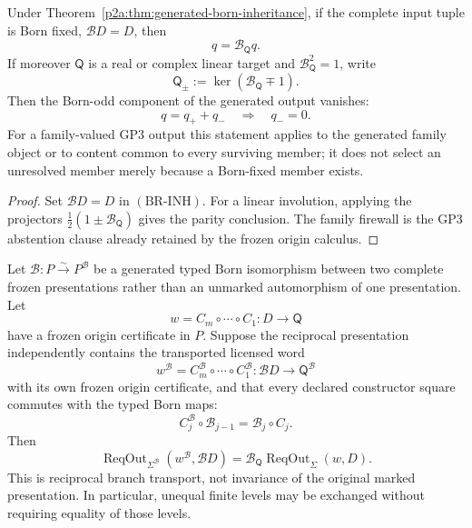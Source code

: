 \documentclass[12pt,a4paper]{article}
\begin{document}
\begin{corollary}
\label{p2a:cor:born-fixed-descendant-parity}
Under Theorem~\ref{p2a:thm:generated-born-inheritance}, if the complete input
tuple is Born fixed, \(\mathcal B D=D\), then
\[
 \boxed{q=\mathcal B_{\mathsf Q}q.}
 \tag{BR-FIX}
\]
If moreover \(\mathsf Q\) is a real or complex linear target and
\(\mathcal B_{\mathsf Q}^2=1\), write
\[
 \mathsf Q_\pm:=\ker(\mathcal B_{\mathsf Q}\mp1).
\]
Then the Born-odd component of the generated output vanishes:
\[
 q=q_++q_-\quad\Longrightarrow\quad\boxed{q_-=0}.
\]
For a family-valued GP3 output this statement applies to the generated family
object or to content common to every surviving member; it does not select an
unresolved member merely because a Born-fixed member exists.
\end{corollary}

\begin{proof}
Set \(\mathcal B D=D\) in \((\mathrm{BR\text{-}INH})\).  For a linear
involution, applying the projectors
\(\frac12(1\pm\mathcal B_{\mathsf Q})\) gives the parity conclusion.  The
family firewall is the GP3 abstention clause already retained by the frozen
origin calculus.
\end{proof}

\begin{proposition}
\label{p2a:prop:typed-born-branch-transport}
Let \(\mathcal B:P\overset{\sim}{\to}P^{\mathcal B}\) be a generated typed
Born isomorphism between two complete frozen presentations rather than an
unmarked automorphism of one presentation.  Let
\[
 w=C_m\circ\cdots\circ C_1:D\to\mathsf Q
\]
have a frozen origin certificate in \(P\).  Suppose the reciprocal
presentation independently contains the transported licensed word
\[
 w^{\mathcal B}=C_m^{\mathcal B}\circ\cdots\circ C_1^{\mathcal B}:
 \mathcal B D\to\mathsf Q^{\mathcal B}
\]
with its own frozen origin certificate, and that every declared constructor
square commutes with the typed Born maps:
\[
 C_j^{\mathcal B}\circ\mathcal B_{j-1}
 =\mathcal B_j\circ C_j.
\]
Then
\[
 \boxed{
 \operatorname{ReqOut}_{\Sigma^{\mathcal B}}
   (w^{\mathcal B},\mathcal B D)
 =\mathcal B_{\mathsf Q}
   \operatorname{ReqOut}_{\Sigma}(w,D).}
 \tag{BR-TR}
\]
This is reciprocal branch transport, not invariance of the original marked
presentation.  In particular, unequal finite levels may be exchanged without
requiring equality of those levels.
\end{proposition}
\end{document}
